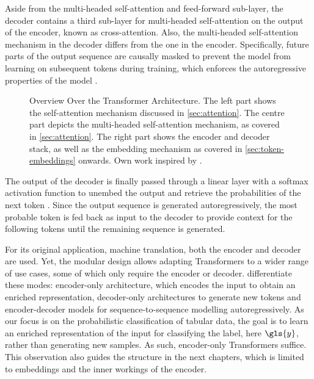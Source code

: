 Aside from the multi-headed self-attention and feed-forward sub-layer, the decoder contains a third sub-layer for multi-headed self-attention on the output of the encoder, known as cross-attention. Also, the multi-headed self-attention mechanism in the decoder differs from the one in the encoder. Specifically, future parts of the output sequence are causally masked to prevent the model from learning on subsequent \glspl{token} during training, which enforces the autoregressive properties of the model \autocites[][3]{vaswaniAttentionAllYou2017}[][15]{narangTransformerModificationsTransfer2021}.

\begin{landscape}
  \begin{figure}[ht]
    \centering
    {\renewcommand\normalsize{\scriptsize}%
      \normalsize
      }
    \caption[Overview Over the Transformer Architecture]{Overview Over the Transformer Architecture. The left part shows the self-attention mechanism discussed in \cref{sec:attention}. The centre part depicts the multi-headed self-attention mechanism, as covered in \cref{sec:attention}. The right part shows the encoder and decoder stack, as well as the \gls{embedding} mechanism as covered in \cref{sec:token-embeddings} onwards. Own work inspired by \textcite[][3]{tayEfficientTransformersSurvey2022}.}
    \label{fig:transformer-architecture-overview}
  \end{figure}
\end{landscape}
The output of the decoder is finally passed through a linear layer with a softmax activation function to unembed the output and retrieve the probabilities of the next \gls{token} \autocite[][5]{vaswaniAttentionAllYou2017}. Since the output sequence is generated autoregressively, the most probable \gls{token} is fed back as input to the decoder to provide context for the following \glspl{token} until the remaining sequence is generated.

For its original application, machine translation, both the encoder and decoder are used. Yet, the modular design allows adapting Transformers to a wider range of use cases, some of which only require the encoder or decoder. \textcite[][16--17]{raffelExploringLimitsTransfer2020} differentiate these modes: encoder-only architecture, which encodes the input to obtain an enriched representation, decoder-only architectures to generate new \glspl{token} and encoder-decoder models for sequence-to-sequence modelling autoregressively. As our focus is on the probabilistic classification of tabular data, the goal is to learn an enriched representation of the input for classifying the label, here $\gls{y}$, rather than generating new samples. As such, encoder-only Transformers suffice. This observation also guides the structure in the next chapters, which is limited to \glspl{embedding} and the inner workings of the encoder.

